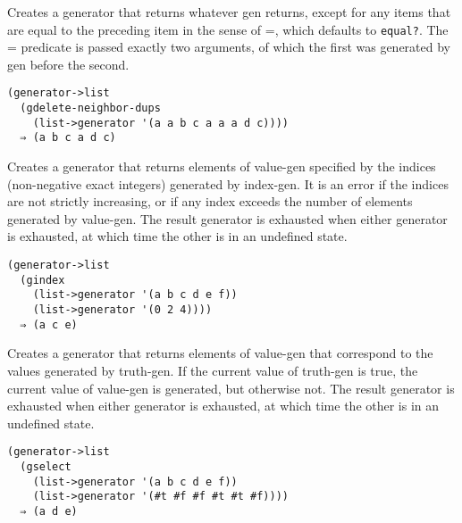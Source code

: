 \begin{entry}{%
  }

Creates a generator that returns whatever gen returns, except for any
items that are equal to the preceding item in the sense of =, which
defaults to \texttt{equal?}. The = predicate is passed exactly two
arguments, of which the first was generated by gen before the second.

\begin{verbatim}
(generator->list 
  (gdelete-neighbor-dups 
    (list->generator '(a a b c a a a d c))))
  ⇒ (a b c a d c)
\end{verbatim}
\end{entry}

\begin{entry}{%
  }

Creates a generator that returns elements of value-gen specified by the
indices (non-negative exact integers) generated by index-gen. It is an
error if the indices are not strictly increasing, or if any index
exceeds the number of elements generated by value-gen. The result
generator is exhausted when either generator is exhausted, at which time
the other is in an undefined state.

\begin{verbatim}
(generator->list 
  (gindex 
    (list->generator '(a b c d e f))
    (list->generator '(0 2 4))))
  ⇒ (a c e)
\end{verbatim}
\end{entry}

\begin{entry}{%
  }

Creates a generator that returns elements of value-gen that correspond
to the values generated by truth-gen. If the current value of truth-gen
is true, the current value of value-gen is generated, but otherwise not.
The result generator is exhausted when either generator is exhausted, at
which time the other is in an undefined state.

\begin{verbatim}
(generator->list 
  (gselect 
    (list->generator '(a b c d e f))
    (list->generator '(#t #f #f #t #t #f))))
  ⇒ (a d e)
\end{verbatim}
\end{entry}

